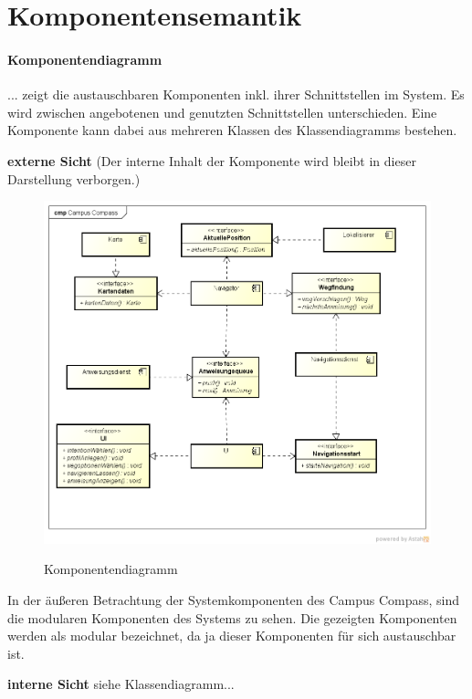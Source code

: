 \chapter{Komponentensemantik}

\subsubsection*{Komponentendiagramm}
... zeigt die austauschbaren Komponenten inkl. ihrer Schnittstellen im System. Es wird zwischen angebotenen und genutzten Schnittstellen unterschieden. Eine Komponente kann dabei aus mehreren Klassen des Klassendiagramms bestehen.

\textbf{externe Sicht}
(Der interne Inhalt der Komponente wird bleibt in dieser Darstellung verborgen.)
\begin{figure}[hbt]
  \centering
  \includegraphics[width=\linewidth]{img/komponentendiagramm_neu.png}
  \label{img:komponentendiagramm}
  \caption{Komponentendiagramm}
\end{figure}

\noindent In der äußeren Betrachtung der Systemkomponenten des Campus Compass, sind die modularen Komponenten des Systems zu sehen. Die gezeigten Komponenten werden als modular bezeichnet, da ja dieser Komponenten für sich austauschbar ist.

\textbf{interne Sicht}
siehe Klassendiagramm...